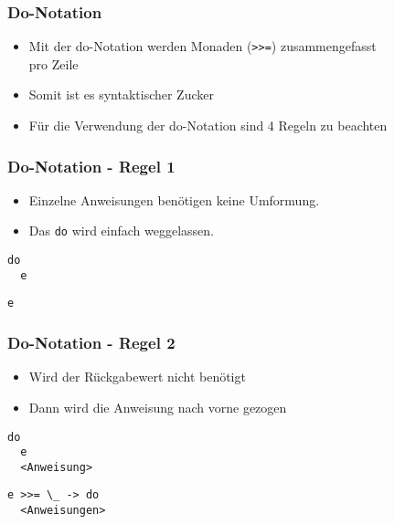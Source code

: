 \begin{frame}
\frametitle{Do-Notation}
\begin{block}{\vspace*{-3ex}}
\begin{itemize}
\item Mit der do-Notation werden Monaden (\lstinline|>>=|) zusammengefasst \\ pro Zeile
\item Somit ist es syntaktischer Zucker
\item Für die Verwendung der do-Notation sind 4 Regeln zu beachten
\end{itemize}
\end{block}
\end{frame}

\begin{frame}[fragile]
\frametitle{Do-Notation - Regel 1}
\begin{block}{\vspace*{-3ex}}
\begin{itemize}
\item Einzelne Anweisungen benötigen keine Umformung.
\item Das \lstinline|do| wird einfach weggelassen.
\end{itemize}
\end{block}
\begin{lstlisting}
do 
  e
\end{lstlisting}	
\pause
\begin{lstlisting}
e
\end{lstlisting}	
\end{frame}

\begin{frame}[fragile]
\frametitle{Do-Notation - Regel 2}
\begin{block}{\vspace*{-3ex}}
\begin{itemize}
\item Wird der Rückgabewert nicht benötigt
\item Dann wird die Anweisung nach vorne gezogen
\end{itemize}
\end{block}
\begin{lstlisting}
do 
  e
  <Anweisung>
\end{lstlisting}	
\pause
\begin{lstlisting}
e >>= \_ -> do
  <Anweisungen>
\end{lstlisting}	
\end{frame}

